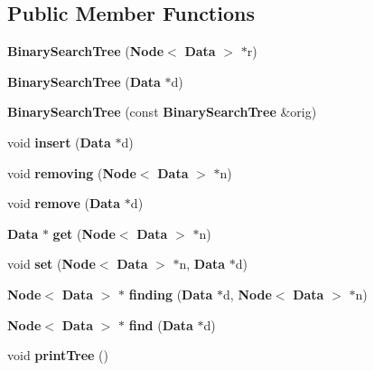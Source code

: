 \subsection*{Public Member Functions}
\begin{DoxyCompactItemize}
\item 
{\bfseries Binary\-Search\-Tree} ({\bf Node}$<$ {\bf Data} $>$ $\ast$r)\label{class_binary_search_tree_a18ff8e101f7f46ecfa513389e0ee1e6e}

\item 
{\bfseries Binary\-Search\-Tree} ({\bf Data} $\ast$d)\label{class_binary_search_tree_ae3cc4b261ab41d29a1d098a9987ed43e}

\item 
{\bfseries Binary\-Search\-Tree} (const {\bf Binary\-Search\-Tree} \&orig)\label{class_binary_search_tree_a950670fa849792208b16e2364606a3c9}

\item 
void {\bfseries insert} ({\bf Data} $\ast$d)\label{class_binary_search_tree_a2336ba86e7d9803c3979b199fea2ae43}

\item 
void {\bfseries removing} ({\bf Node}$<$ {\bf Data} $>$ $\ast$n)\label{class_binary_search_tree_aa853db6eed3b39b2db829c715413526b}

\item 
void {\bfseries remove} ({\bf Data} $\ast$d)\label{class_binary_search_tree_a89e97ae842dae9bf54d5dd27c59ee04c}

\item 
{\bf Data} $\ast$ {\bfseries get} ({\bf Node}$<$ {\bf Data} $>$ $\ast$n)\label{class_binary_search_tree_a4374a8c6a86507203322aa336651582d}

\item 
void {\bfseries set} ({\bf Node}$<$ {\bf Data} $>$ $\ast$n, {\bf Data} $\ast$d)\label{class_binary_search_tree_a0b3fa4f1e1d76ced3cabe222ad4edfbd}

\item 
{\bf Node}$<$ {\bf Data} $>$ $\ast$ {\bfseries finding} ({\bf Data} $\ast$d, {\bf Node}$<$ {\bf Data} $>$ $\ast$n)\label{class_binary_search_tree_af68ea8fa6620026c26c5a5634382d032}

\item 
{\bf Node}$<$ {\bf Data} $>$ $\ast$ {\bfseries find} ({\bf Data} $\ast$d)\label{class_binary_search_tree_ac560fff2205ef8633b9b35a5c1af568f}

\item 
void {\bfseries print\-Tree} ()\label{class_binary_search_tree_a4f8f2ce34a8099962133e954122764fa}


\end{DoxyCompactItemize}
